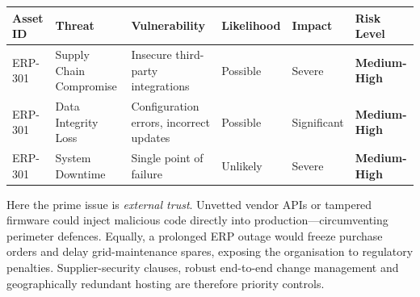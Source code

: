 \begin{longtable}{|p{2cm}|p{2.5cm}|p{3cm}|p{2cm}|p{2cm}|p{2cm}|}
  \hline
  \textbf{Asset ID} & \textbf{Threat} & \textbf{Vulnerability} & \textbf{Likelihood} & \textbf{Impact} & \textbf{Risk Level} \\
  \hline
  \endhead
  ERP-301 & Supply Chain Compromise & Insecure third-party integrations & Possible & Severe & \textbf{Medium-High} \\
  \hline
  ERP-301 & Data Integrity Loss & Configuration errors, incorrect updates & Possible & Significant & \textbf{Medium-High} \\
  \hline
  ERP-301 & System Downtime & Single point of failure & Unlikely & Severe & \textbf{Medium-High} \\
  \hline
  \end{longtable}

Here the prime issue is \emph{external trust}. Unvetted vendor APIs or tampered firmware could inject malicious code directly into production—circumventing perimeter defences.  
Equally, a prolonged ERP outage would freeze purchase orders and delay grid-maintenance spares, exposing the organisation to regulatory penalties.  
Supplier-security clauses, robust end-to-end change management and geographically redundant hosting are therefore priority controls.

